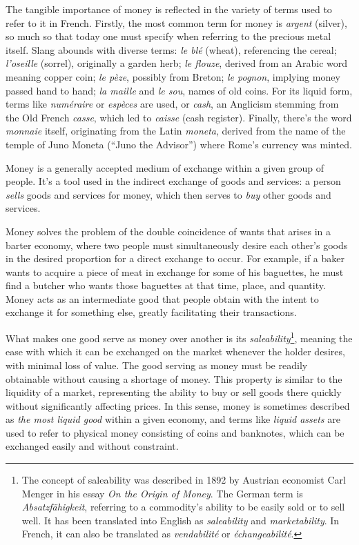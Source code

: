 \documentclass[
  a5paper,
  smalldemyvopaper,10pt,twoside,onecolumn,openright,extrafontsizes,hidelinks]{memoir}
\begin{document}
The tangible importance of money is reflected in the variety of terms
used to refer to it in French. Firstly, the most common term for money
is \emph{argent} (silver), so much so that today one must specify when
referring to the precious metal itself. Slang abounds with diverse
terms: \emph{le blé} (wheat), referencing the cereal; \emph{l'oseille}
(sorrel), originally a garden herb; \emph{le flouze}, derived from an
Arabic word meaning copper coin; \emph{le pèze}, possibly from Breton;
\emph{le pognon}, implying money passed hand to hand; \emph{la maille}
and \emph{le sou}, names of old coins. For its liquid form, terms like
\emph{numéraire} or \emph{espèces} are used, or \emph{cash}, an
Anglicism stemming from the Old French \emph{casse}, which led to
\emph{caisse} (cash register). Finally, there's the word \emph{monnaie}
itself, originating from the Latin \emph{moneta}, derived from the name
of the temple of Juno Moneta (``Juno the Advisor'') where Rome's
currency was minted.

Money is a generally accepted medium of exchange within a given group of
people. It's a tool used in the indirect exchange of goods and services:
a person \emph{sells} goods and services for money, which then serves to
\emph{buy} other goods and services.

Money solves the problem of the double coincidence of wants that arises
in a barter economy, where two people must simultaneously desire each
other's goods in the desired proportion for a direct exchange to occur.
For example, if a baker wants to acquire a piece of meat in exchange for
some of his baguettes, he must find a butcher who wants those baguettes
at that time, place, and quantity. Money acts as an intermediate good
that people obtain with the intent to exchange it for something else,
greatly facilitating their transactions.

What makes one good serve as money over another is its
\emph{saleability}\footnote{The concept of saleability was described in
  1892 by Austrian economist Carl Menger in his essay \emph{On the
  Origin of Money}. The German term is \emph{Absatzfähigkeit}, referring
  to a commodity's ability to be easily sold or to sell well. It has
  been translated into English as \emph{saleability} and
  \emph{marketability}. In French, it can also be translated as
  \emph{vendabilité} or \emph{échangeabilité}.}, meaning the ease with
which it can be exchanged on the market whenever the holder desires,
with minimal loss of value. The good serving as money must be readily
obtainable without causing a shortage of money. This property is similar
to the liquidity of a market, representing the ability to buy or sell
goods there quickly without significantly affecting prices. In this
sense, money is sometimes described as \emph{the most liquid good}
within a given economy, and terms like \emph{liquid assets} are used to
refer to physical money consisting of coins and banknotes, which can be
exchanged easily and without constraint.
\end{document}
